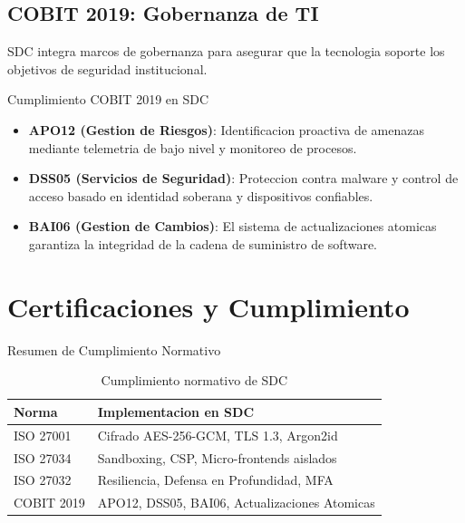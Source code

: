
\subsection{COBIT 2019: Gobernanza de TI}

SDC integra marcos de gobernanza para asegurar que la tecnologia soporte los objetivos de seguridad institucional.

\begin{caja}{Cumplimiento COBIT 2019 en SDC}
\begin{itemize}
\item \textbf{APO12 (Gestion de Riesgos)}: Identificacion proactiva de amenazas mediante telemetria de bajo nivel y monitoreo de procesos.

\item \textbf{DSS05 (Servicios de Seguridad)}: Proteccion contra malware y control de acceso basado en identidad soberana y dispositivos confiables.

\item \textbf{BAI06 (Gestion de Cambios)}: El sistema de actualizaciones atomicas garantiza la integridad de la cadena de suministro de software.
\end{itemize}
\end{caja}


\section{Certificaciones y Cumplimiento}

\begin{caja}{Resumen de Cumplimiento Normativo}
\end{caja}

\begin{table}[H]
\centering
\begin{tabular}{p{4cm}p{8cm}}
\toprule
\textbf{Norma} & \textbf{Implementacion en SDC} \\
\midrule
ISO 27001 & Cifrado AES-256-GCM, TLS 1.3, Argon2id \\
\midrule
ISO 27034 & Sandboxing, CSP, Micro-frontends aislados \\
\midrule
ISO 27032 & Resiliencia, Defensa en Profundidad, MFA \\
\midrule
COBIT 2019 & APO12, DSS05, BAI06, Actualizaciones Atomicas \\
\bottomrule
\end{tabular}
\caption{Cumplimiento normativo de SDC}
\label{tab:cumplimiento}
\end{table}

